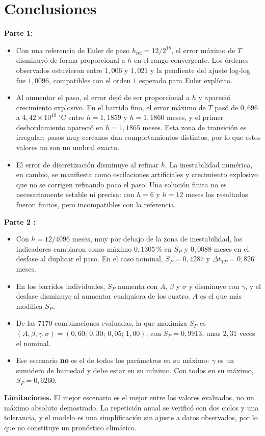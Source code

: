 \section{Conclusiones}

\textbf{Parte 1:}
\begin{itemize}
    \item Con una referencia de Euler de paso $h_{\mathrm{ref}}=12/2^{18}$,
    el error máximo de $T$ disminuyó de forma proporcional a $h$ en el rango
    convergente. Los órdenes observados estuvieron entre $1{,}006$ y $1{,}021$
    y la pendiente del ajuste log-log fue $1{,}0096$, compatibles con el orden
    $1$ esperado para Euler explícito.
    \item Al aumentar el paso, el error dejó de ser proporcional a $h$ y
    apareció crecimiento explosivo. En el barrido fino, el error máximo de $T$
    pasó de $0{,}696$ a $4{,}42\times10^{49}\;{}^\circ\mathrm{C}$ entre
    $h=1{,}1859$ y $h=1{,}1860$ meses, y el primer desbordamiento apareció
    en $h=1{,}1865$ meses. Esta zona de transición es irregular: pasos muy
    cercanos dan comportamientos distintos, por lo que estos valores no son un
    umbral exacto.
    \item El error de discretización disminuye al refinar $h$. La inestabilidad
    numérica, en cambio, se manifiesta como oscilaciones artificiales y
    crecimiento explosivo que no se corrigen refinando poco el paso. Una
    solución finita no es necesariamente estable ni precisa: con $h=6$ y
    $h=12$ meses los resultados fueron finitos, pero incompatibles con la
    referencia.
\end{itemize}


\textbf{Parte 2
:}
\begin{itemize}
    \item Con $h=12/4096$ meses, muy por debajo de la zona de inestabilidad,
    los indicadores cambiaron como máximo $0{,}1305\,\%$ en $S_P$ y $0{,}0088$
    meses en el desfase al duplicar el paso. En el caso nominal, $S_P=0{,}4287$ y $\Delta t_{TP}=0{,}826$ meses.
    \item En los barridos individuales, $S_P$ aumenta con $A$, $\beta$ y
    $\sigma$ y disminuye con $\gamma$, y el desfase disminuye al aumentar
    cualquiera de los cuatro. $A$ es el que más modifica $S_P$.
    \item De las $7170$ combinaciones evaluadas, la que maximiza $S_P$ es
    $(A,\beta,\gamma,\sigma)=(0{,}60;\,0{,}30;\,0{,}05;\,1{,}00)$, con
    $S_P=0{,}9913$, unas $2{,}31$ veces el nominal.
    \item Ese escenario \textbf{no} es el de todos los parámetros en su
    máximo: $\gamma$ es un sumidero de humedad y debe estar en su mínimo.
    Con todos en su máximo, $S_P=0{,}6260$.
\end{itemize}

\textbf{Limitaciones.} El mejor escenario es el mejor entre los valores
evaluados, no un máximo absoluto demostrado. La repetición anual se verificó
con dos ciclos y una tolerancia, y el modelo es una simplificación sin ajuste
a datos observados, por lo que no constituye un pronóstico climático.